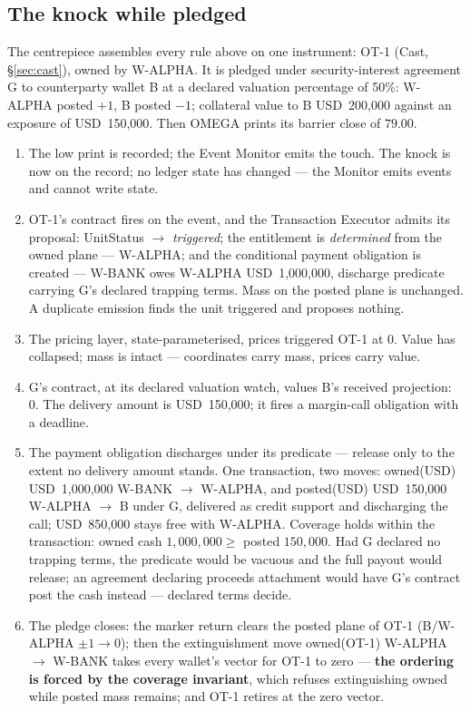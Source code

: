 \documentclass[11pt,a4paper]{article}
\newcommand{\USD}[1]{\mbox{USD~#1}}
\begin{document}
\subsection{The knock while pledged}\label{sec:knockpledged}

The centrepiece assembles every rule above on one instrument: OT-1 (Cast,
\S\ref{sec:cast}), owned by W-ALPHA. It is pledged under security-interest
agreement G to counterparty wallet B at a declared valuation percentage of
50\%: W-ALPHA posted $+1$, B posted $-1$; collateral value to B
\USD{200,000} against an exposure of \USD{150,000}. Then OMEGA prints its
barrier close of $79.00$.

\begin{enumerate}[label=\textbf{\arabic*.},nosep,itemsep=2pt]
\item The low print is recorded; the Event Monitor emits the touch. The knock
is now on the record; no ledger state has changed --- the Monitor emits
events and cannot write state.
\item OT-1's contract fires on the event, and the Transaction Executor admits
its proposal: UnitStatus $\to$ \emph{triggered}; the entitlement is
\emph{determined} from the owned plane --- W-ALPHA; and the conditional
payment obligation is created --- W-BANK owes W-ALPHA \USD{1,000,000},
discharge predicate carrying G's declared trapping terms. Mass on the posted
plane is unchanged. A duplicate emission finds the unit triggered and proposes
nothing.
\item The pricing layer, state-parameterised, prices triggered OT-1 at 0.
Value has collapsed; mass is intact --- coordinates carry mass, prices carry
value.
\item G's contract, at its declared valuation watch, values B's received
projection: 0. The delivery amount is \USD{150,000}; it fires a margin-call
obligation with a deadline.
\item The payment obligation discharges under its predicate --- release only
to the extent no delivery amount stands. One transaction, two moves:
owned(USD) \USD{1,000,000} W-BANK $\to$ W-ALPHA, and posted(USD)
\USD{150,000} W-ALPHA $\to$ B under G, delivered as credit support and
discharging the call; \USD{850,000} stays free with W-ALPHA. Coverage holds
within the transaction: owned cash $1{,}000{,}000 \ge$ posted $150{,}000$.
Had G declared no trapping terms, the predicate would be vacuous and the full
payout would release; an agreement declaring proceeds attachment would have
G's contract post the cash instead --- declared terms decide.
\item The pledge closes: the marker return clears the posted plane of OT-1
(B/W-ALPHA $\pm 1 \to 0$); then the extinguishment move owned(OT-1) W-ALPHA
$\to$ W-BANK takes every wallet's vector for OT-1 to zero --- \textbf{the
ordering is forced by the coverage invariant}, which refuses extinguishing
owned while posted mass remains; and OT-1 retires at the zero vector.
\end{enumerate}
\end{document}
